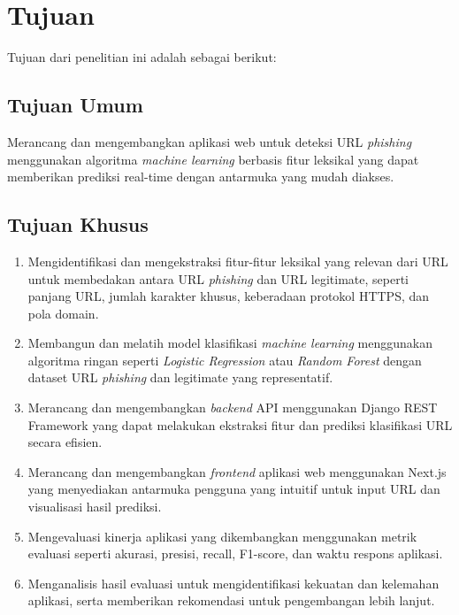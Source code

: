 \section{Tujuan}

Tujuan dari penelitian ini adalah sebagai berikut:

\subsection{Tujuan Umum}

Merancang dan mengembangkan aplikasi web untuk deteksi URL \textit{phishing} menggunakan algoritma \textit{machine learning} berbasis fitur leksikal yang dapat memberikan prediksi real-time dengan antarmuka yang mudah diakses.

\subsection{Tujuan Khusus}

\begin{enumerate}
    \item Mengidentifikasi dan mengekstraksi fitur-fitur leksikal yang relevan dari URL untuk membedakan antara URL \textit{phishing} dan URL legitimate, seperti panjang URL, jumlah karakter khusus, keberadaan protokol HTTPS, dan pola domain.
    
    \item Membangun dan melatih model klasifikasi \textit{machine learning} menggunakan algoritma ringan seperti \textit{Logistic Regression} atau \textit{Random Forest} dengan dataset URL \textit{phishing} dan legitimate yang representatif.
    
    \item Merancang dan mengembangkan \textit{backend} API menggunakan Django REST Framework yang dapat melakukan ekstraksi fitur dan prediksi klasifikasi URL secara efisien.
    
    \item Merancang dan mengembangkan \textit{frontend} aplikasi web menggunakan Next.js yang menyediakan antarmuka pengguna yang intuitif untuk input URL dan visualisasi hasil prediksi.
    
    \item Mengevaluasi kinerja aplikasi yang dikembangkan menggunakan metrik evaluasi seperti akurasi, presisi, recall, F1-score, dan waktu respons aplikasi.
    
    \item Menganalisis hasil evaluasi untuk mengidentifikasi kekuatan dan kelemahan aplikasi, serta memberikan rekomendasi untuk pengembangan lebih lanjut.
\end{enumerate}
